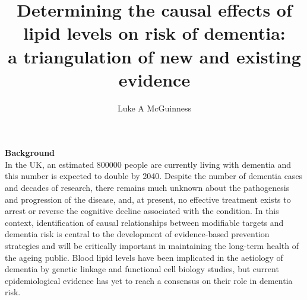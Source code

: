 \documentclass[a4paper, twoside]{templates/ociamthesis}
\title{Determining the causal effects of lipid levels on risk of dementia:\\
a triangulation of new and existing evidence}
\author{Luke A McGuinness}
\begin{document}
\setlength{\textbaselineskip}{22pt plus2pt}

\setlength{\frontmatterbaselineskip}{17pt plus1pt minus1pt}

\setlength{\abstractseparatelineskip}{13pt plus1pt minus1pt}
\setlength{\abstractseparateparskip}{0pt plus 1pt}

\setlength{\parskip}{6pt plus 1pt}


\setlength{\baselineskip}{\textbaselineskip}



\setcounter{secnumdepth}{2}
\setcounter{tocdepth}{2}
\setcounter{minitocdepth}{1} 

\begin{abstractseparate}
  \textbf{Background}\\
  In the UK, an estimated 800000 people are currently living with dementia and this number is expected to double
  by 2040. Despite the number of dementia cases and decades of research, there remains much unknown about
  the pathogenesis and progression of the disease, and, at present, no effective treatment exists to arrest or
  reverse the cognitive decline associated with the condition. In this context, identification of causal relationships
  between modifiable targets and dementia risk is central to the development of evidence-based prevention
  strategies and will be critically important in maintaining the long-term health of the ageing public. Blood lipid
  levels have been implicated in the aetiology of dementia by genetic linkage and functional cell biology studies,
  but current epidemiological evidence has yet to reach a consensus on their role in dementia risk.
\end{abstractseparate}
\end{document}

